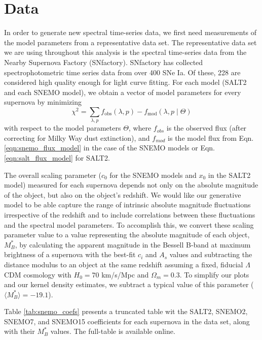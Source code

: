 \section{Data}
\label{sec:data}
In order to generate new spectral time-series data, we first need measurements of the model parameters from a representative data set. The representative data set we are using throughout this analysis is the spectral time-series data from the Nearby Supernova Factory (SNfactory). SNfactory has collected spectrophotometric time series data from over 400 SNe Ia. Of these, 228 are considered high quality enough for light curve fitting. For each model (SALT2 and each SNEMO model), we obtain a vector of model parameters for every supernova by minimizing
\begin{equation}
    \chi^2 = \displaystyle\sum_{\lambda, p} f_\text{obs}(\lambda, p) - f_\text{mod}(\lambda, p\;|\; \Theta)
\end{equation}
with respect to the model parameters $\Theta$, where $f_{obs}$ is the observed flux (after correcting for Milky Way dust extinction), and $f_{mod}$ is the model flux from Eqn. \ref{eqn:snemo_flux_model} in the case of the SNEMO models or Eqn. \ref{eqn:salt_flux_model} for SALT2.

The overall scaling parameter ($c_0$ for the SNEMO models and $x_0$ in the SALT2 model) measured for each supernova depends not only on the absolute magnitude of the object, but also on the object's redshift. We would like our generative model to be able capture the range of intrinsic absolute magnitude fluctuations irrespective of the redshift and to include correlations between these fluctuations and the spectral model parameters. To accomplish this, we convert these scaling parameter value to a value representing the absolute magnitude of each object, $M_B^*$, by calculating the apparent magnitude in the Bessell B-band at maximum brightness of a supernova with the best-fit $c_i$ and $A_s$ values and subtracting the distance modulus to an object at the same redshift assuming a fixed, fiducial $\Lambda$CDM cosmology with $H_0=70$ km/s/Mpc and $\Omega_{m}=0.3$. To simplify our plots and our kernel density estimates, we subtract a typical value of this parameter ($\langle M_B^*\rangle = -19.1$).

Table \ref{tab:snemo_coefs} presents a truncated table wit the SALT2, SNEMO2, SNEMO7, and SNEMO15 coefficients for each supernova in the data set, along with their $M_B^*$ values. The full-table is available online.


